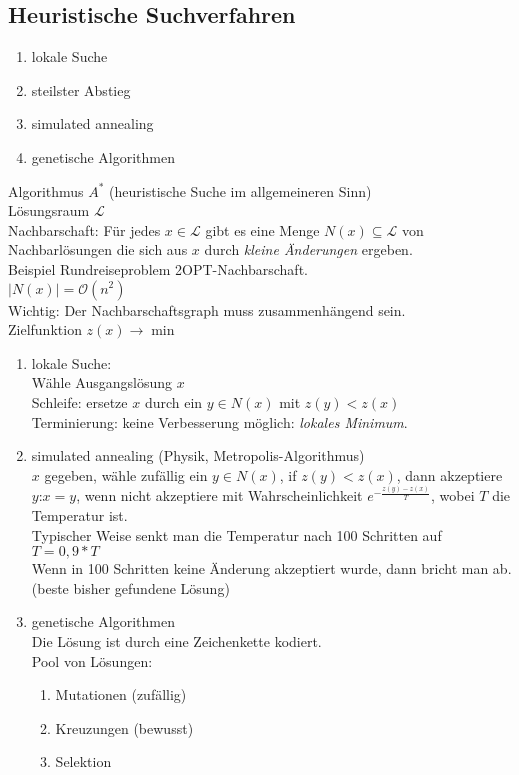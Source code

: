 \subsection{Heuristische Suchverfahren}
\begin{enumerate}
\item lokale Suche
\item steilster Abstieg
\item simulated annealing
\item genetische Algorithmen
\end{enumerate}
Algorithmus $A^*$ (heuristische Suche im allgemeineren Sinn)\\
Lösungsraum $\mathcal{L}$\\
Nachbarschaft: Für jedes $x \in \mathcal{L}$ gibt es eine Menge $N(x) \subseteq \mathcal{L}$ von Nachbarlösungen die sich aus $x$ durch \emph{kleine Änderungen} ergeben.\\
Beispiel Rundreiseproblem 2OPT-Nachbarschaft.\\
$|N(x)|=\mathcal{O}(n^2)$\\
Wichtig: Der Nachbarschaftsgraph muss zusammenhängend sein.\\
Zielfunktion $z(x) \rightarrow \min$\\
\begin{enumerate}
\item lokale Suche:\\
Wähle Ausgangslösung $x$\\
Schleife: ersetze $x$ durch ein $y \in N(x)$ mit $z(y) < z(x)$\\
Terminierung: keine Verbesserung möglich: \emph{lokales Minimum}.\\
\item simulated annealing (Physik, Metropolis-Algorithmus)\\
$x$ gegeben, wähle zufällig ein $y \in N(x)$, if $z(y) < z(x)$, dann akzeptiere $y$:$x=y$, wenn nicht akzeptiere mit Wahrscheinlichkeit $e^{-\frac{z(y)-z(x)}{T}}$, wobei $T$ die Temperatur ist.\\
Typischer Weise senkt man die Temperatur nach 100 Schritten auf $T=0,9 * T$\\
Wenn in 100 Schritten keine Änderung akzeptiert wurde, dann bricht man ab. (beste bisher gefundene Lösung)\\
\item genetische Algorithmen\\
Die Lösung ist durch eine Zeichenkette kodiert.\\
Pool von Lösungen:
\begin{enumerate}
\item Mutationen (zufällig)
\item Kreuzungen (bewusst)
\item Selektion
\end{enumerate}
\end{enumerate}